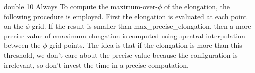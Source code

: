 \myhrule

{double}
{10}
{Always}
{To compute the maximum-over-$\phi$ of the elongation, the following procedure is employed. First the elongation is evaluated at each point on the $\phi$ grid. If the result is smaller than {\ttfamily max\_precise\_elongation}, then a more precise value of emaximum elongation is computed using spectral interpolation between the $\phi$ grid points. The idea is that if the elongation is more than this threshold, we don't care about the precise value because the configuration is irrelevant, so don't invest the time in a precise computation.}

\myhrule

